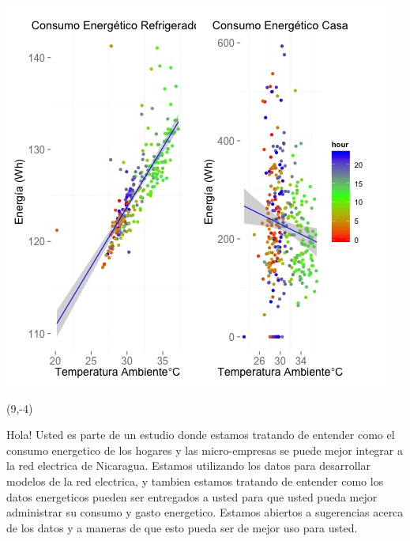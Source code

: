 \documentclass{article}\usepackage[]{graphicx}\usepackage[]{color}
\newenvironment{knitrout}{}{} %
\begin{document}
\begin{knitrout}
\color{fgcolor}
\includegraphics[scale=0.75]{figure/A21_correlaciones} 
\end{knitrout}

 \begin{textblock}{1}(9,-4)
\begin{minipage}{20em}
\begingroup

\endgroup
\end{minipage}
\end{textblock}

\vspace{70px}
\begin{knitrout}
Hola! Usted es parte de un estudio donde estamos tratando de entender como el consumo energetico de los hogares y las micro-empresas se puede mejor integrar a la red electrica de Nicaragua. Estamos utilizando los datos para desarrollar modelos de la red electrica, y tambien estamos tratando de entender como los datos energeticos pueden ser entregados a usted para que usted pueda mejor administrar su consumo y gasto energetico.  Estamos abiertos a sugerencias acerca de los datos y a maneras de que esto pueda ser de mejor uso para usted.
\end{knitrout}
\end{document}

